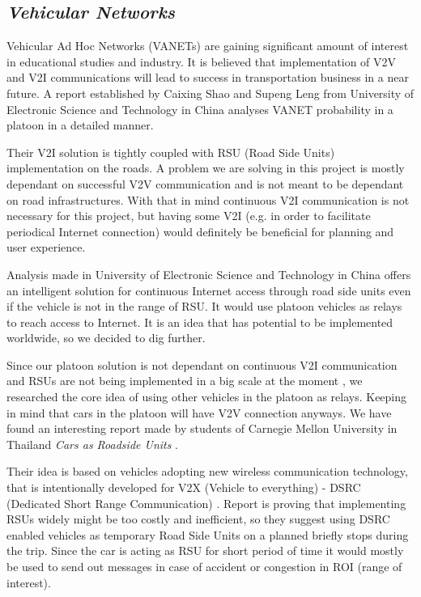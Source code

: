 \subsection{\textit{Vehicular Networks}}

% 
Vehicular Ad Hoc Networks (VANETs) are gaining significant amount of interest in educational studies and industry. It is believed that implementation of V2V and V2I communications will lead to success in transportation business in a near future. A report established by Caixing Shao and Supeng Leng from University of Electronic Science and Technology in China \cite{Shao2014AnalysisNetworks} analyses VANET probability in a platoon in a detailed manner.\par
% 
Their V2I solution is tightly coupled with RSU (Road Side Units) implementation on the roads. A problem we are solving in this project is mostly dependant on successful V2V communication and is not meant to be dependant on road infrastructures. With that in mind continuous V2I communication is not necessary for this project, but having some V2I (e.g. in order to facilitate periodical Internet connection) would definitely be beneficial for planning and user experience.\par
% 
Analysis made in University of Electronic Science and Technology in China offers an intelligent solution for continuous Internet access through road side units even if the vehicle is not in the range of RSU. It would use platoon vehicles as relays to reach access to Internet. It is an idea that has potential to be implemented worldwide, so we decided to dig further.\par
% 
Since our platoon solution is not dependant on continuous V2I communication and RSUs are not being implemented in a big scale at the moment \cite{Tonguz2013CarsSolution}, we researched the core idea of using other vehicles in the platoon as relays. Keeping in mind that cars in the platoon will have V2V connection anyways. We have found an interesting report made by students of Carnegie Mellon University in Thailand \emph{Cars as Roadside Units} \cite{Tonguz2013CarsSolution}.\par
% 
Their idea is based on vehicles adopting new wireless communication technology, that is intentionally developed for V2X (Vehicle to everything) - DSRC (Dedicated Short Range Communication) \cite{OfficeoftheAssistantSecretaryforResearchandTechnologyIntelligentSheet}.
Report is proving that implementing RSUs widely might be too costly and inefficient, so they suggest using DSRC enabled vehicles as temporary Road Side Units on a planned briefly stops during the trip. Since the car is acting as RSU for short period of time it would mostly be used to send out messages in case of accident or congestion in ROI (range of interest).